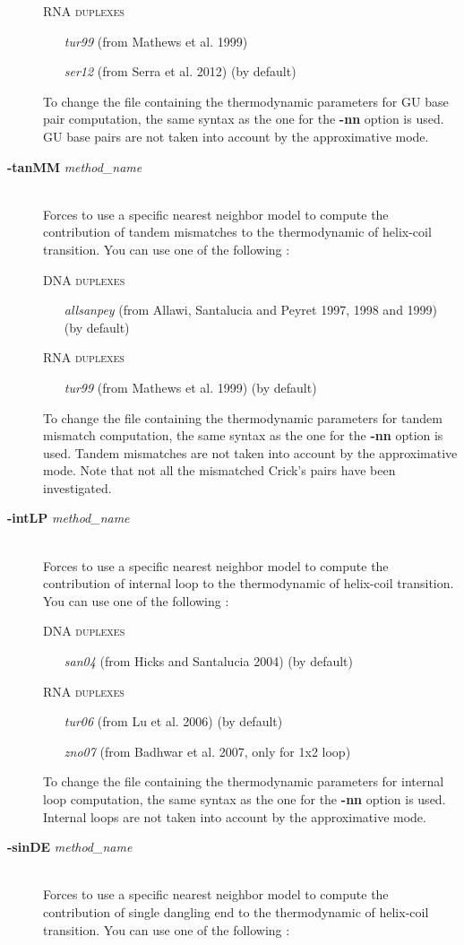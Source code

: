 \documentclass{article}
\begin{document}
\begin{description}
  \textsc{RNA duplexes}
    \begin{itemize}
    \item [\textit{tur99}] (from Mathews et al. 1999)
    \item [\textit{ser12}] (from Serra et al. 2012) (by default)
    \end{itemize}
  To change the file containing the thermodynamic parameters for GU base pair computation, the same syntax as the one for the \textbf{-nn} option is used.
  GU base pairs are not taken into account by the approximative mode.
\item [\textbf{-tanMM} \textit{method\_name}]\mbox{}\\ 
  Forces to use a specific nearest neighbor model to compute the contribution of tandem mismatches to the thermodynamic of helix-coil transition. 
  You can use one of the following :
  
  \textsc{DNA duplexes}
    \begin{itemize}
    \item [\textit{allsanpey}] (from Allawi, Santalucia and Peyret 1997, 1998 and 1999)  (by default) 
    \end{itemize}
  \textsc{RNA duplexes}
    \begin{itemize}
    \item [\textit{tur99}] (from Mathews et al. 1999) (by default)		 		 
    \end{itemize}
  To change the file containing the thermodynamic parameters for tandem mismatch computation, the same syntax as the one for the \textbf{-nn} option is used.
  Tandem mismatches are not taken into account by the approximative mode. Note that not all the mismatched Crick's pairs have been investigated. 
\item [\textbf{-intLP} \textit{method\_name}]\mbox{}\\ 
  Forces to use a specific nearest neighbor model to compute the contribution of internal loop to the thermodynamic of helix-coil transition. 
  You can use one of the following :
  
  \textsc{DNA duplexes}
    \begin{itemize}
    \item [\textit{san04}] (from Hicks and Santalucia 2004)  (by default) 
    \end{itemize}
  \textsc{RNA duplexes}
    \begin{itemize}
    \item [\textit{tur06}] (from Lu et al. 2006) (by default)
    \item [\textit{zno07}] (from Badhwar et al. 2007, only for 1x2 loop)  
    \end{itemize}
  To change the file containing the thermodynamic parameters for internal loop computation, the same syntax as the one for the \textbf{-nn} option is used.
  Internal loops are not taken into account by the approximative mode.   
\item [\textbf{-sinDE} \textit{method\_name}]\mbox{}\\ 
  Forces to use a specific nearest neighbor model to compute the contribution of single dangling end to the thermodynamic of helix-coil transition. 
  You can use one of the following :
  

\end{description}
\end{document}
